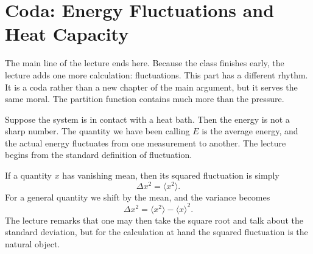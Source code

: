 \section{Coda: Energy Fluctuations and Heat Capacity}

The main line of the lecture ends here. Because the class finishes early, the lecture adds one more calculation: fluctuations. This part has a different rhythm. It is a coda rather than a new chapter of the main argument, but it serves the same moral. The partition function contains much more than the pressure.

Suppose the system is in contact with a heat bath. Then the energy is not a sharp number. The quantity we have been calling \(E\) is the average energy, and the actual energy fluctuates from one measurement to another. The lecture begins from the standard definition of fluctuation.

If a quantity \(x\) has vanishing mean, then its squared fluctuation is simply
\begin{equation}
\Delta x^2=\langle x^2\rangle.
\end{equation}
For a general quantity we shift by the mean, and the variance becomes
\begin{equation}
\Delta x^2=\langle x^2\rangle-\langle x\rangle^2.
\end{equation}
The lecture remarks that one may then take the square root and talk about the standard deviation, but for the calculation at hand the squared fluctuation is the natural object.

